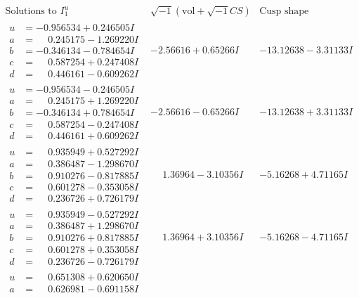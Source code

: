\documentclass[1p]{elsarticle_modified}
\theoremstyle{definition}
\newcommand{\I}{\sqrt{-1}}
\begin{document}
$$\begin{array}{c|c|c}  
\text{Solutions to }I^u_{1}& \I (\text{vol} + \sqrt{-1}CS) & \text{Cusp shape}\\
 \hline 
\begin{aligned}
u &= -0.956534 + 0.246505 I \\
a &= \phantom{-}0.245175 - 1.269220 I \\
b &= -0.346134 - 0.784654 I \\
c &= \phantom{-}0.587254 + 0.247408 I \\
d &= \phantom{-}0.446161 - 0.609262 I\end{aligned}
 & -2.56616 + 0.65266 I & -13.12638 - 3.31133 I \\ \hline\begin{aligned}
u &= -0.956534 - 0.246505 I \\
a &= \phantom{-}0.245175 + 1.269220 I \\
b &= -0.346134 + 0.784654 I \\
c &= \phantom{-}0.587254 - 0.247408 I \\
d &= \phantom{-}0.446161 + 0.609262 I\end{aligned}
 & -2.56616 - 0.65266 I & -13.12638 + 3.31133 I \\ \hline\begin{aligned}
u &= \phantom{-}0.935949 + 0.527292 I \\
a &= \phantom{-}0.386487 - 1.298670 I \\
b &= \phantom{-}0.910276 - 0.817885 I \\
c &= \phantom{-}0.601278 - 0.353058 I \\
d &= \phantom{-}0.236726 + 0.726179 I\end{aligned}
 & \phantom{-}1.36964 - 3.10356 I & -5.16268 + 4.71165 I \\ \hline\begin{aligned}
u &= \phantom{-}0.935949 - 0.527292 I \\
a &= \phantom{-}0.386487 + 1.298670 I \\
b &= \phantom{-}0.910276 + 0.817885 I \\
c &= \phantom{-}0.601278 + 0.353058 I \\
d &= \phantom{-}0.236726 - 0.726179 I\end{aligned}
 & \phantom{-}1.36964 + 3.10356 I & -5.16268 - 4.71165 I \\ \hline\begin{aligned}
u &= \phantom{-}0.651308 + 0.620650 I \\
a &= \phantom{-}0.626981 - 0.691158 I \\

\end{aligned}
\end{array}$$
\end{document}
